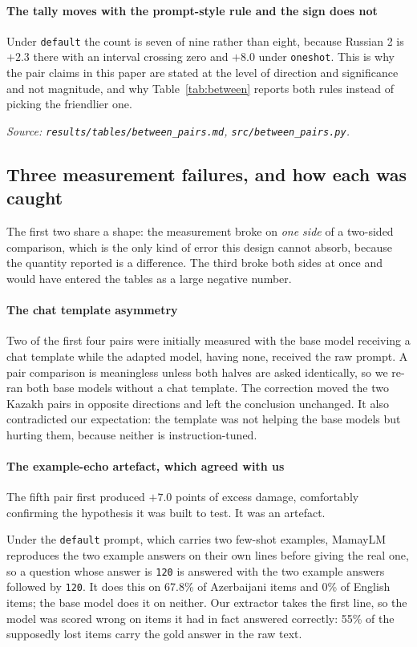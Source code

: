 \documentclass[final]{clv2025}
\begin{document}
\paragraph{The tally moves with the prompt-style rule and the sign does not}
Under \texttt{default} the count is seven of nine rather than eight, because
Russian 2 is $+2.3$ there with an interval crossing zero and $+8.0$ under
\texttt{oneshot}. This is why the pair claims in this paper are stated at the
level of direction and significance and not magnitude, and why
Table~\ref{tab:between} reports both rules instead of picking the friendlier
one.

\emph{Source: \texttt{results/tables/between\_pairs.md},
\texttt{src/between\_pairs.py}.}

\subsection{Three measurement failures, and how each was caught}
\label{sec:failures}

The first two share a shape: the measurement broke on \emph{one side} of a
two-sided comparison, which is the only kind of error this design cannot
absorb, because the quantity reported is a difference. The third broke both
sides at once and would have entered the tables as a large negative number.

\paragraph{The chat template asymmetry} Two of the first four pairs were
initially measured with the base model receiving a chat template while the
adapted model, having none, received the raw prompt. A pair comparison is
meaningless unless both halves are asked identically, so we re-ran both base
models without a chat template. The correction moved the two Kazakh pairs in
opposite directions and left the conclusion unchanged. It also contradicted our
expectation: the template was not helping the base models but hurting them,
because neither is instruction-tuned.

\paragraph{The example-echo artefact, which agreed with us} The fifth pair
first produced $+7.0$ points of excess damage, comfortably confirming the
hypothesis it was built to test. It was an artefact.

Under the \texttt{default} prompt, which carries two few-shot examples, MamayLM
reproduces the two example answers on their own lines before giving the real
one, so a question whose answer is \texttt{120} is answered with the two
example answers followed by \texttt{120}. It does this on 67.8\% of Azerbaijani
items and 0\% of English items; the base model does it on neither. Our
extractor takes the first line, so the model was scored wrong on items it had
in fact answered correctly: 55\% of the supposedly lost items carry the gold
answer in the raw text.
\end{document}
